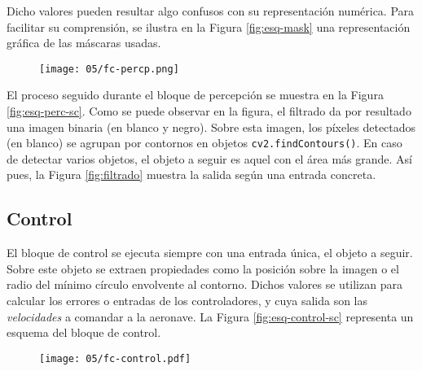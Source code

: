\documentclass[../main.tex]{subfiles}
\begin{document}
Dicho valores pueden resultar algo confusos con su representación numérica. Para facilitar su comprensión, se ilustra en la Figura \ref{fig:esq-mask} una representación gráfica de las máscaras usadas.

\begin{figure}[!ht]
 	{\texttt{[image: 05/fc-percp.png]}}
\end{figure}

El proceso seguido durante el bloque de percepción se muestra en la Figura \ref{fig:esq-perc-sc}. Como se puede observar en la figura, el filtrado da por resultado una imagen binaria (en blanco y negro). Sobre esta imagen, los píxeles detectados (en blanco) se agrupan por contornos en objetos \lstinline{cv2.findContours()}. En caso de detectar varios objetos, el objeto a seguir es aquel con el área más grande. Así pues, la Figura \ref{fig:filtrado} muestra la salida según una entrada concreta.

\begin{figure}[ht]
\end{figure}

\subsection*{Control}
El bloque de control se ejecuta siempre con una entrada única, el objeto a seguir. Sobre este objeto se extraen propiedades como la posición sobre la imagen o el radio del mínimo círculo envolvente al contorno. Dichos valores se utilizan para calcular los errores o entradas de los controladores, y cuya salida son las \textit{velocidades} a comandar a la aeronave. La Figura \ref{fig:esq-control-sc} representa un esquema del bloque de control.

\begin{figure}[!ht]
 	{\texttt{[image: 05/fc-control.pdf]}}
\end{figure}
\end{document}
